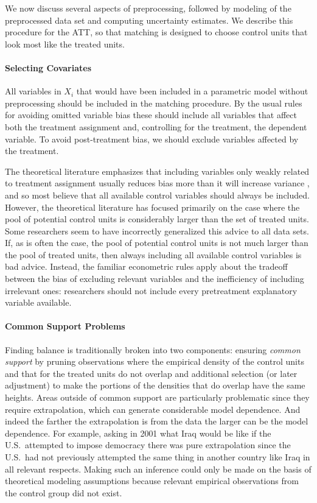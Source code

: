 \documentclass[11pt,titlepage]{article}
\begin{document}
We now discuss several aspects of preprocessing, followed by modeling
of the preprocessed data set and computing uncertainty estimates.  We
describe this procedure for the ATT, so that matching is designed to
choose control units that look most like the treated units.

\paragraph{Selecting Covariates}
All variables in $X_i$ that would have been included in a parametric
model without preprocessing should be included in the matching
procedure.  By the usual rules for avoiding omitted variable bias
these should include all variables that affect both the treatment
assignment and, controlling for the treatment, the dependent variable.
To avoid post-treatment bias, we should exclude variables affected by
the treatment.

The theoretical literature emphasizes that including variables only
weakly related to treatment assignment usually reduces bias more than
it will increase variance \citep{RubTho96, HecIchSmi98}, and so most
believe that all available control variables should always be
included.  However, the theoretical literature has focused primarily
on the case where the pool of potential control units is considerably
larger than the set of treated units.  Some researchers seem to
have incorrectly generalized this advice to all data sets.  If, as is
often the case, the pool of potential control units is not much larger
than the pool of treated units, then always including all available
control variables is bad advice.  Instead, the familiar econometric
rules apply about the tradeoff between the bias of excluding relevant
variables and the inefficiency of including irrelevant ones:
researchers should not include every pretreatment explanatory
variable available.

\paragraph{Common Support Problems}

Finding balance is traditionally broken into two components: ensuring
\emph{common support} by pruning observations where the empirical
density of the control units and that for the treated units do not
overlap and additional selection (or later adjustment) to make the
portions of the densities that do overlap have the same heights.
Areas outside of common support are particularly problematic since
they require extrapolation, which can generate considerable model
dependence.  And indeed the farther the extrapolation is from the data
the larger can be the model dependence.  For example, asking in 2001
what Iraq would be like if the U.S.\ attempted to impose democracy
there was pure extrapolation since the U.S.\ had not previously
attempted the same thing in another country like Iraq in all relevant
respects.  Making such an inference could only be made on the basis of
theoretical modeling assumptions because relevant empirical
observations from the control group did not exist.
\end{document}
